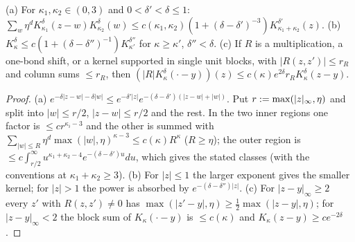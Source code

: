 \begin{lemma}[convolution and smearing; $d=3$, sup metric]\label{sup1:lem:S12}
\textup{(a)} For $\kappa_1,\kappa_2\in(0,3)$ and $0<\delta'<\delta\le1$: $\sum_w\eta^dK^\delta_{\kappa_1}(z-w)K^\delta_{\kappa_2}(w)\le c(\kappa_1,\kappa_2)(1+(\delta-\delta')^{-3})K^{\delta'}_{\kappa_1+\kappa_2}(z)$. \textup{(b)} $K^\delta_\kappa\le c(1+(\delta-\delta'')^{-1})K^{\delta''}_{\kappa'}$ for $\kappa\ge\kappa'$, $\delta''<\delta$. \textup{(c)} If $R$ is a multiplication, a one-bond shift, or a kernel supported in single unit blocks, with $|R(z,z')|\le r_R$ and column sums $\le r_R$, then $(|R|K^\delta_\kappa(\cdot-y))(z)\le c(\kappa)e^{2\delta}r_RK^\delta_\kappa(z-y)$.
\end{lemma}

\begin{proof}
(a) $e^{-\delta|z-w|-\delta|w|}\le e^{-\delta'|z|}e^{-(\delta-\delta')(|z-w|+|w|)}$. Put $r:=\max(|z|_\infty,\eta)$ and split into $|w|\le r/2$, $|z-w|\le r/2$ and the rest. In the two inner regions one factor is $\le cr^{\kappa_i-3}$ and the other is summed with $\sum_{|w|\le R}\eta^d\max(|w|,\eta)^{\kappa-3}\le c(\kappa)R^\kappa$ ($R\ge\eta$); the outer region is $\le c\int_{r/2}^\infty u^{\kappa_1+\kappa_2-4}e^{-(\delta-\delta')u}du$, which gives the stated classes (with the conventions at $\kappa_1+\kappa_2\ge3$). (b) For $|z|\le1$ the larger exponent gives the smaller kernel; for $|z|>1$ the power is absorbed by $e^{-(\delta-\delta'')|z|}$. (c) For $|z-y|_\infty\ge2$ every $z'$ with $R(z,z')\ne0$ has $\max(|z'-y|,\eta)\ge\frac12\max(|z-y|,\eta)$; for $|z-y|_\infty<2$ the block sum of $K_\kappa(\cdot-y)$ is $\le c(\kappa)$ and $K_\kappa(z-y)\ge ce^{-2\delta}$.
\end{proof}

